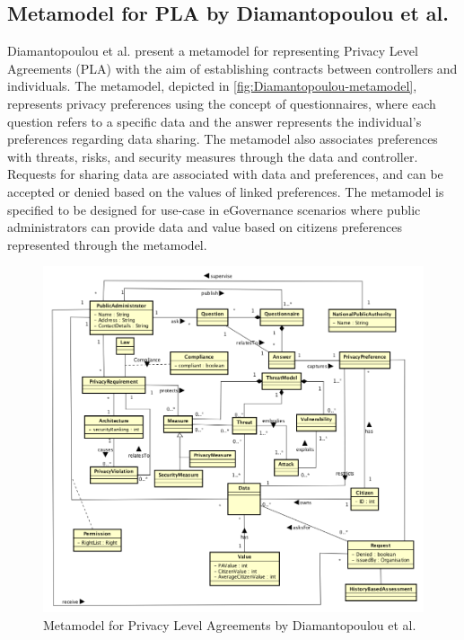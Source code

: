 \subsection*{Metamodel for PLA by Diamantopoulou et al.}
Diamantopoulou et al. present a metamodel for representing Privacy Level Agreements (PLA) with the aim of establishing contracts between controllers and individuals.
The metamodel, depicted in \autoref{fig:Diamantopoulou-metamodel}, represents privacy preferences using the concept of questionnaires, where each question refers to a specific data and the answer represents the individual's preferences regarding data sharing. The metamodel also associates preferences with threats, risks, and security measures through the data and controller. Requests for sharing data are associated with data and preferences, and can be accepted or denied based on the values of linked preferences.
The metamodel is specified to be designed for use-case in eGovernance scenarios where public administrators can provide data and value based on citizens preferences represented through the metamodel.
\begin{figure}[htbp]
    \centering
    \includegraphics[width=0.8\linewidth]{img/Diamantopoulou_metamodel.png}
    \caption{Metamodel for Privacy Level Agreements by Diamantopoulou et al. \cite{diamantopoulou_metamodel_2017}}
    \label{fig:Diamantopoulou-metamodel}
\end{figure}

